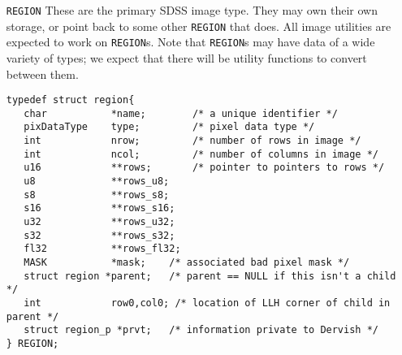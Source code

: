 {\begin{itemize}
\begin{verbatim}
typedef struct mask {
   char *name;          /* identifying name */
   int nrow;            /* number of rows in mask */
   int ncol;            /* number of columns in mask */
   MASK_PIX **rows;     /* pointer to pointers to rows */
   struct mask *parent; /* parent == NULL if this isn't a child */
   int    row0,col0;    /* location of LLH corner of child in parent */
   struct mask_p *prvt; /* information private to Dervish */
} MASK;
\end{verbatim}
The values used to set {\tt MASK} bits will be defined in some suitable
enumerated type; the one in V1.3 looked like:
\begin{verbatim}
enum {
   MASK_OBJ =      01,  /* pixel belongs to some sort of object */
   MASK_CR =      010,  /* pixel hit by a cosmic-ray */
   MASK_GHOST =   020,  /* contaminated by a ghost image */
   MASK_BADCOL =  040,  /* part of a bad column */
   MASK_SATUR =  0100,  /* pixel is saturated */
   MASK_BADPIX = 0200   /* a bad pixel on the chip */
  };
#define IS_MASKOK(X) \
  (!((X) & (MASK_CR | MASK_GHOST | MASK_BADCOL | MASK_SATUR | MASK_BADPIX)))
\end{verbatim}
{\em This enum is not part of the level 0 specification}, and
is almost certain to change. The point is that mask bits are
centrally allocated. You also should not rely on a {\tt MASK\_PIX} having
8 bits; future versions may have more, although this will not impact
you if you use the pre-defined values.

\item[{\tt REGION}]
These are the primary SDSS image type. They may own their
own storage, or point back to some other {\tt REGION} that does. All
image utilities are expected to work on {\tt REGION}s. Note that
{\tt REGION}s may have data of a wide variety of types; we expect that
there will be utility functions to convert between them.

\begin{verbatim}
typedef struct region{
   char           *name;        /* a unique identifier */
   pixDataType    type;         /* pixel data type */
   int            nrow;         /* number of rows in image */
   int            ncol;         /* number of columns in image */
   u16            **rows;       /* pointer to pointers to rows */
   u8             **rows_u8;
   s8             **rows_s8;
   s16            **rows_s16;
   u32            **rows_u32;
   s32            **rows_s32;
   fl32           **rows_fl32;
   MASK           *mask;    /* associated bad pixel mask */
   struct region *parent;   /* parent == NULL if this isn't a child */
   int            row0,col0; /* location of LLH corner of child in parent */
   struct region_p *prvt;   /* information private to Dervish */
} REGION;
\end{verbatim}


\end{itemize}}
